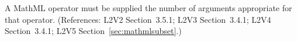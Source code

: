 A MathML operator must be supplied the number of arguments appropriate for
that operator.  (References: L2V2 Section~3.5.1; L2V3 Section~3.4.1; L2V4 Section~3.4.1; L2V5 Section~\ref{sec:mathmlsubset}.)
